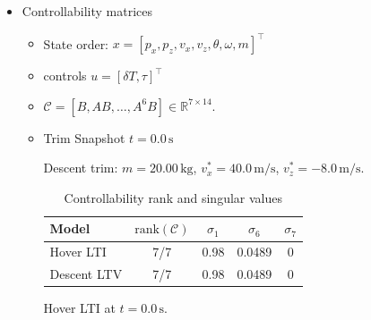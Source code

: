 \documentclass[letterpaper, 10 pt, conference]{ieeeconf}
\begin{document}
\begin{itemize}
    \item Controllability matrices
        \begin{itemize}
            \item State order: $x=[p_x,p_z,v_x,v_z,\theta,\omega,m]^\top$
            \item controls $u=[\delta T,\tau]^\top$
            \item $\mathcal{C}=[B,AB,\ldots,A^{6}B]\in\mathbb{R}^{7\times 14}$.
        \end{itemize}
        
        \begin{itemize}
            \item Trim Snapshot $t=0.0\,\mathrm{s}$
            
            Descent trim: $m=20.00\,\mathrm{kg}$, $v_x^\ast=40.0\,\mathrm{m/s}$, $v_z^\ast=-8.0\,\mathrm{m/s}$.
            
            \begin{table}[H]
                \centering
                \caption{Controllability rank and singular values}
                \small
                \setlength{\tabcolsep}{4pt}
                \begin{tabular}{@{}lcccc@{}}
                \toprule
                Model & $\mathrm{rank}(\mathcal{C})$ & $\sigma_1$ & $\sigma_6$ & $\sigma_7$ \\
                \midrule
                Hover LTI & 7/7 & 0.98 & 0.0489 & 0 \\
                Descent LTV & 7/7 & 0.98 & 0.0489 & 0 \\
                \bottomrule
                \end{tabular}
            \end{table}
                
            Hover LTI at $t=0.0\,\mathrm{s}$.
                

\end{itemize}
\end{itemize}
\end{document}
